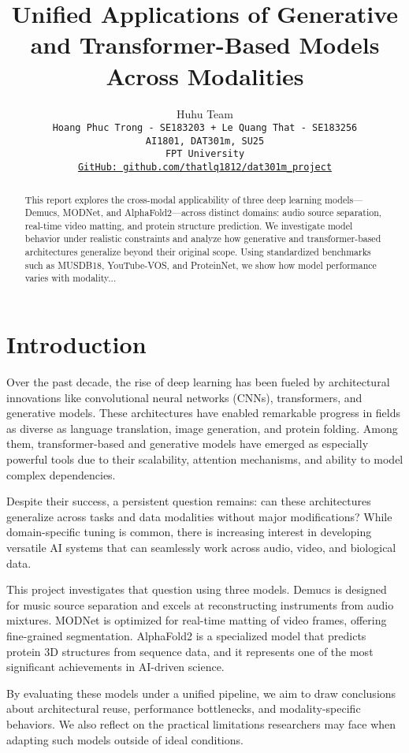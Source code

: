 \documentclass{article}
\title{Unified Applications of Generative and Transformer-Based Models Across Modalities}
\author{%
  Huhu Team \\
  \texttt{Hoang Phuc Trong - SE183203 + Le Quang That - SE183256} \\
  \texttt{AI1801, DAT301m, SU25} \\
  \texttt{FPT University} \\
  \href{https://github.com/thatlq1812/dat301m_project}{\texttt{GitHub: github.com/thatlq1812/dat301m\_project}}
}
\begin{document}
\maketitle

\begin{abstract}
This report explores the cross-modal applicability of three deep learning models—Demucs, MODNet, and AlphaFold2—across distinct domains: audio source separation, real-time video matting, and protein structure prediction. We investigate model behavior under realistic constraints and analyze how generative and transformer-based architectures generalize beyond their original scope. Using standardized benchmarks such as MUSDB18, YouTube-VOS, and ProteinNet, we show how model performance varies with modality...
\end{abstract}

\section{Introduction}
Over the past decade, the rise of deep learning has been fueled by architectural innovations like convolutional neural networks (CNNs), transformers, and generative models. These architectures have enabled remarkable progress in fields as diverse as language translation, image generation, and protein folding. Among them, transformer-based and generative models have emerged as especially powerful tools due to their scalability, attention mechanisms, and ability to model complex dependencies.

Despite their success, a persistent question remains: can these architectures generalize across tasks and data modalities without major modifications? While domain-specific tuning is common, there is increasing interest in developing versatile AI systems that can seamlessly work across audio, video, and biological data.

This project investigates that question using three models. Demucs is designed for music source separation and excels at reconstructing instruments from audio mixtures. MODNet is optimized for real-time matting of video frames, offering fine-grained segmentation. AlphaFold2 is a specialized model that predicts protein 3D structures from sequence data, and it represents one of the most significant achievements in AI-driven science.

By evaluating these models under a unified pipeline, we aim to draw conclusions about architectural reuse, performance bottlenecks, and modality-specific behaviors. We also reflect on the practical limitations researchers may face when adapting such models outside of ideal conditions.
\end{document}
